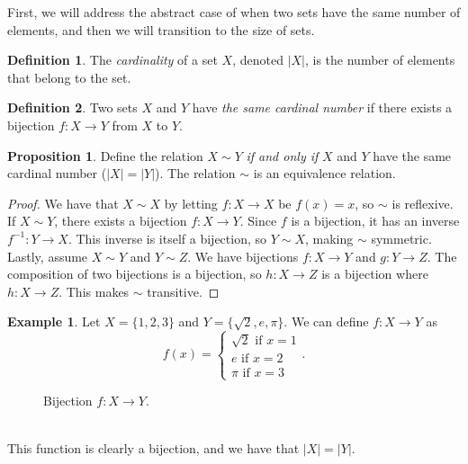 \documentclass{article}
\theoremstyle{definition}
\newtheorem{proposition}{Proposition}[section]
\newtheorem{definition}{Definition}[section]
\newtheorem{example}{Example}[section]
\begin{document}
	First, we will address the abstract case of when two sets have the same number of elements, and then we will transition to the size of sets.
	\begin{definition}
		The \textit{\color{red}cardinality} of a set $ X $, denoted $ |X| $, is the number of elements that belong to the set.   
	\end{definition} 
	\begin{definition}
		Two sets $ X $ and $ Y $ have \textit{\color{red}the same cardinal number} if there exists a bijection $ f:X\to Y $ from $ X $ to $ Y $.  
	\end{definition} 
	\begin{proposition}
		Define the relation $ X\sim Y $ \textit{if and only if} $ X $ and $ Y $ have the same cardinal number ($ |X|=|Y| $). The relation $ \sim $ is an equivalence relation. 
	\end{proposition} 
	\begin{proof}
		We have that $ X\sim X $ by letting $ f:X\to X $ be $ f(x)=x $, so $ \sim $ is reflexive. If $ X\sim Y $, there exists a bijection $ f:X\to Y $. Since $ f $ is a bijection, it has an inverse $ f^{-1}:Y\to X $. This inverse is itself a bijection, so $ Y\sim X $, making $ \sim $ symmetric. Lastly, assume $ X\sim Y $ and $ Y\sim Z $. We have bijections $ f:X\to Y $ and $ g:Y\to Z $. The composition of two bijections is a bijection, so $ h:X\to Z $ is a bijection where $ h:X\to Z $. This makes $ \sim $ transitive.  
	\end{proof}
	\begin{example}
		Let $ X=\{1,2,3\} $ and $ Y=\{\sqrt{2},e,\pi\} $. We can define $ f:X\to Y $ as $$ f(x)=\begin{cases}
			\sqrt{2}\text{ if }x=1\\e\text{ if }x=2\\\pi\text{ if }x=3
		\end{cases}.$$
		\begin{figure}[h!]
			\centering
			\caption{Bijection $ f:X\to Y $.}
		\end{figure}  \\
		This function is clearly a bijection, and we have that $ |X|=|Y| $.
	\end{example} 
\end{document}
